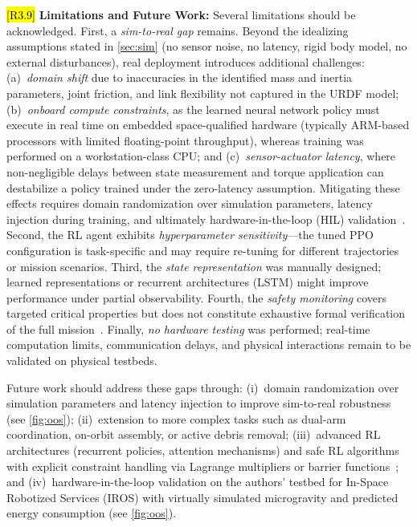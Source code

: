 \documentclass{ieeeaccess}
\newcommand{\hlthree}[1]{{\sethlcolor{rthree}\hl{#1}}}
\newenvironment{rthreehl}
  {\def\FrameCommand{\colorbox{rthree}}\MakeFramed{\advance\hsize-\width\FrameRestore}}
  {\endMakeFramed}
\begin{document}
\begin{rthreehl}
\hlthree{[R3.9]} \textbf{Limitations and Future Work:}
Several limitations should be acknowledged. First, a \emph{sim-to-real gap} remains. Beyond the idealizing assumptions stated in \autoref{sec:sim} (no sensor noise, no latency, rigid body model, no external disturbances), real deployment introduces additional challenges: (a)~\emph{domain shift} due to inaccuracies in the identified mass and inertia parameters, joint friction, and link flexibility not captured in the URDF model; (b)~\emph{onboard compute constraints}, as the learned neural network policy must execute in real time on embedded space-qualified hardware (typically ARM-based processors with limited floating-point throughput), whereas training was performed on a workstation-class CPU; and (c)~\emph{sensor-actuator latency}, where non-negligible delays between state measurement and torque application can destabilize a policy trained under the zero-latency assumption. Mitigating these effects requires domain randomization over simulation parameters, latency injection during training, and ultimately hardware-in-the-loop (HIL) validation~\cite{b8,b22}.
Second, the RL agent exhibits \emph{hyperparameter sensitivity}---the tuned PPO configuration is task-specific and may require re-tuning for different
trajectories or mission scenarios. Third, the \emph{state representation} was manually designed; learned representations or recurrent architectures (LSTM)
might improve performance under partial observability. Fourth, the \emph{safety monitoring} covers targeted critical properties but does not constitute
exhaustive formal verification of the full mission~\cite{b5,b22}. Finally, \emph{no hardware testing} was performed; real-time computation limits,
communication delays, and physical interactions remain to be validated on physical testbeds.

Future work should address these gaps through: (i)~domain randomization over simulation parameters and latency injection to improve sim-to-real robustness~\cite{b8} (see \cref{fig:oos}); (ii)~extension to more complex tasks such as dual-arm coordination, on-orbit assembly, or active debris removal; (iii)~advanced
RL architectures (recurrent policies, attention mechanisms) and safe RL algorithms with explicit constraint handling via Lagrange multipliers
or barrier functions~\cite{b22,b24,b23,b34}; and (iv)~hardware-in-the-loop validation on the authors' testbed for In-Space Robotized Services (IROS) with virtually simulated microgravity and predicted energy consumption (see \cref{fig:oos}).
\end{rthreehl}
\end{document}
